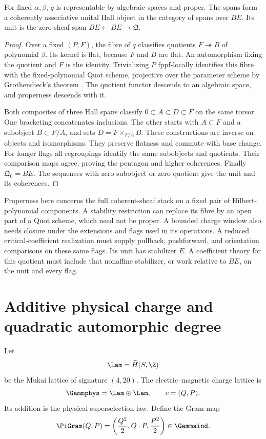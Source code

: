 \begin{theorem}
\label{igusa:platonic-common-torsor-hall}
For fixed \(\alpha,\beta\), \(q\) is representable by
algebraic spaces and proper. The spans form a coherently associative
unital Hall object in the category of spans over \(BE\).
Its unit is the zero-sheaf span
\(BE\leftarrow BE\to\mathfrak Q\).
\end{theorem}
\begin{proof}
Over a fixed \((P,F)\), the fibre of \(q\) classifies
quotients \(F\twoheadrightarrow B\) of polynomial \(\beta\).
Its kernel is flat, because \(F\) and \(B\) are flat.
An automorphism fixing the quotient and \(F\) is the identity.
Trivializing \(P\) fppf-locally identifies this fibre with the
fixed-polynomial Quot scheme, projective over the parameter scheme
by Grothendieck's theorem \cite[Theorem~3.2]{IgusaGrothendieckQuot1961}.
The quotient functor descends to an algebraic space, and properness
descends with it.

Both composites of three Hall spans classify
\(0\subset A\subset D\subset F\) on the same torsor.
One bracketing concatenates inclusions. The other starts with
\(A\subset F\) and a subobject \(B\subset F/A\), and sets
\(D=F\times_{F/A}B\). These constructions are inverse on
objects and isomorphisms. They preserve flatness and commute with
base change. For longer flags all regroupings identify the same
subobjects and quotients. Their comparison maps agree, proving the
pentagon and higher coherences. Finally \(\mathfrak Q_0=BE\).
The sequences with zero subobject or zero quotient give the unit
and its coherences.
\end{proof}

Properness here concerns the full coherent-sheaf stack on a fixed
pair of Hilbert-polynomial components. A stability restriction can
replace its fibre by an open part of a Quot scheme, which need not
be proper. A bounded charge window also needs closure under the
extensions and flags used in its operations. A reduced critical-coefficient realization must supply pullback,
pushforward, and orientation comparisons on these same flags. Its unit has
stabilizer \(E\). A coefficient theory for this quotient must
include that nonaffine stabilizer, or work relative to \(BE\),
on the unit and every flag.


\chapter{Additive physical charge and quadratic automorphic degree}
Let
\[
 \Lam=\widetilde H(S,\Z)
\]
be the Mukai lattice of signature $(4,20)$. The electric--magnetic charge lattice is
\[
 \Gammphys=\Lam\oplus\Lam,
 \qquad c=(Q,P).
\]
Its addition is the physical superselection law. Define the Gram map
\[
 \PiGram(Q,P)=
 \left(\frac{Q^2}{2},Q\cdot P,\frac{P^2}{2}\right)
 \in\Gammaind.
\]

